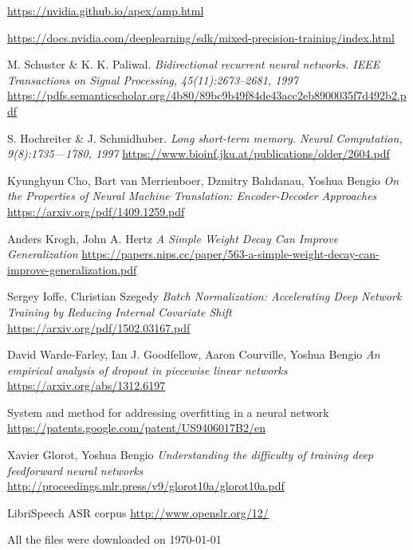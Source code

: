 \documentclass[licencjacka,en]{pracamgr}
\newcommand{\bibDownloadDate}{\today}
\begin{document}
\begin{thebibliography}{99}
 \href{https://nvidia.github.io/apex/amp.html}{https://nvidia.github.io/apex/amp.html}

 \href{https://docs.nvidia.com/deeplearning/sdk/mixed-precision-training/index.html}{https://docs.nvidia.com/deeplearning/sdk/mixed-precision-training/index.html}

 M. Schuster \& K. K. Paliwal. \textit{Bidirectional recurrent neural networks. IEEE Transactions on Signal Processing, 45(11):2673–2681, 1997} \href{https://pdfs.semanticscholar.org/4b80/89bc9b49f84de43acc2eb8900035f7d492b2.pdf}{https://pdfs.semanticscholar.org/4b80/89bc9b49f84de43acc2eb8900035f7d492b2.pdf}

 S. Hochreiter \& J. Schmidhuber. \textit{Long short-term memory. Neural Computation, 9(8):1735—1780, 1997} \href{https://www.bioinf.jku.at/publications/older/2604.pdf}{https://www.bioinf.jku.at/publications/older/2604.pdf}

 Kyunghyun Cho, Bart van Merrienboer, Dzmitry Bahdanau, Yoshua Bengio \textit{On the Properties of Neural Machine Translation: Encoder-Decoder Approaches} \href{https://arxiv.org/pdf/1409.1259.pdf}{https://arxiv.org/pdf/1409.1259.pdf}

 Anders Krogh, John A. Hertz \textit{A Simple Weight Decay Can Improve Generalization} \href{https://papers.nips.cc/paper/563-a-simple-weight-decay-can-improve-generalization.pdf}{https://papers.nips.cc/paper/563-a-simple-weight-decay-can-improve-generalization.pdf}

 Sergey Ioffe, Christian Szegedy \textit{Batch Normalization: Accelerating Deep Network Training by Reducing Internal Covariate Shift} \href{https://arxiv.org/pdf/1502.03167.pdf}{https://arxiv.org/pdf/1502.03167.pdf}

 David Warde-Farley, Ian J. Goodfellow, Aaron Courville, Yoshua Bengio \textit{An empirical analysis of dropout in piecewise linear networks
} \href{https://arxiv.org/abs/1312.6197}{https://arxiv.org/abs/1312.6197}

 System and method for addressing overfitting in a neural network \href{https://patents.google.com/patent/US9406017B2/en}{https://patents.google.com/patent/US9406017B2/en}

 Xavier Glorot, Yoshua Bengio \textit{Understanding the difficulty of training deep feedforward neural networks} \href{http://proceedings.mlr.press/v9/glorot10a/glorot10a.pdf}{http://proceedings.mlr.press/v9/glorot10a/glorot10a.pdf}

 LibriSpeech ASR corpus \href{http://www.openslr.org/12/}{http://www.openslr.org/12/}

\end{thebibliography}
All the files were downloaded on \bibDownloadDate
\end{document}
